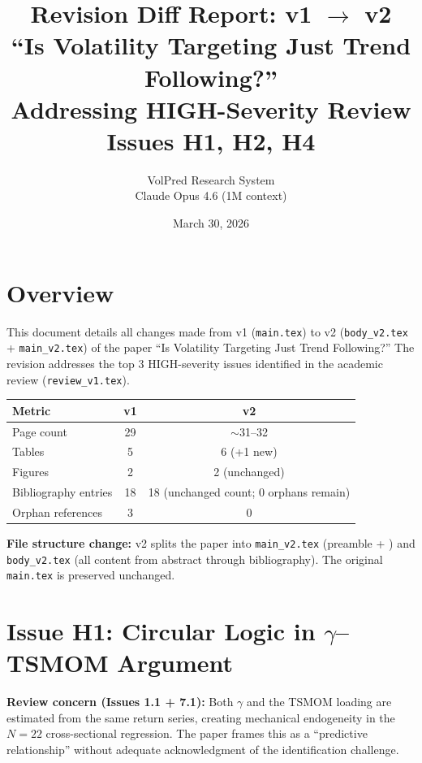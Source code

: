 \documentclass[12pt,a4paper]{article}
\title{Revision Diff Report: v1 $\to$ v2\\
\Large ``Is Volatility Targeting Just Trend Following?''\\[6pt]
\normalsize Addressing HIGH-Severity Review Issues H1, H2, H4}
\author{VolPred Research System\\
\small Claude Opus 4.6 (1M context)}
\date{March 30, 2026}
\begin{document}
\maketitle

\tableofcontents
\newpage

\section{Overview}

This document details all changes made from v1 (\texttt{main.tex}) to v2 (\texttt{body\_v2.tex} + \texttt{main\_v2.tex}) of the paper ``Is Volatility Targeting Just Trend Following?'' The revision addresses the top 3 HIGH-severity issues identified in the academic review (\texttt{review\_v1.tex}).

\begin{center}
\begin{tabular}{lcc}
\toprule
Metric & v1 & v2 \\
\midrule
Page count & 29 & $\sim$31--32 \\
Tables & 5 & 6 (+1 new) \\
Figures & 2 & 2 (unchanged) \\
Bibliography entries & 18 & 18 (unchanged count; 0 orphans remain) \\
Orphan references & 3 & 0 \\
\bottomrule
\end{tabular}
\end{center}

\medskip
\noindent\textbf{File structure change:} v2 splits the paper into \texttt{main\_v2.tex} (preamble + \verb||) and \texttt{body\_v2.tex} (all content from abstract through bibliography). The original \texttt{main.tex} is preserved unchanged.


\section{Issue H1: Circular Logic in $\gamma$--TSMOM Argument}

\noindent\textbf{Review concern (Issues 1.1 + 7.1):} Both $\gamma$ and the TSMOM loading are estimated from the same return series, creating mechanical endogeneity in the $N=22$ cross-sectional regression. The paper frames this as a ``predictive relationship'' without adequate acknowledgment of the identification challenge.
\end{document}
